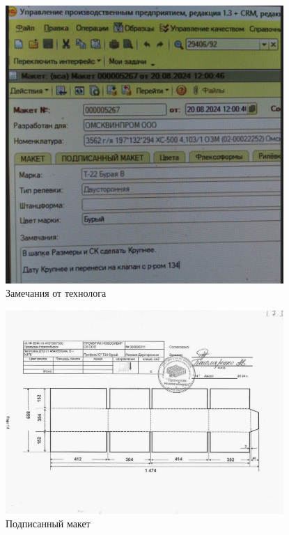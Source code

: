 \begin{figure}
\begin{center}
  \includegraphics[height=0.94\textheight, width=0.94\textwidth, keepaspectratio]{Pics 1/1 Замечания технолога в ТК.png }
\end{center}
  \caption{Замечания от технолога}
  \label{pic:1 Замечания технолога в ТК}
\end{figure}

\begin{figure}
\begin{center}
  \includegraphics[height=0.94\textheight, width=0.94\textwidth, keepaspectratio]{Pics 1/1.7.3 подписанный макет_0001.jpg }
\end{center}
  \caption{Подписанный макет}
  \label{pic:1.7.3 подписанный макет_0001}
\end{figure}

